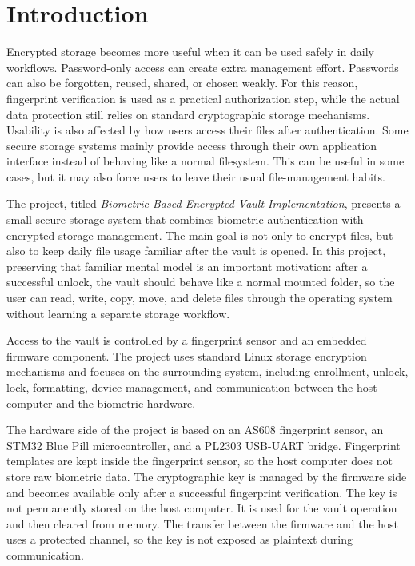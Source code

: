 \chapter{Introduction}

Encrypted storage becomes more useful when it can be used safely in daily workflows. Password-only access can create extra management effort. Passwords can also be forgotten, reused, shared, or chosen weakly. For this reason, fingerprint verification is used as a practical authorization step, while the actual data protection still relies on standard cryptographic storage mechanisms. Usability is also affected by how users access their files after authentication. Some secure storage systems mainly provide access through their own application interface instead of behaving like a normal filesystem. This can be useful in some cases, but it may also force users to leave their usual file-management habits.

The project, titled \textit{Biometric-Based Encrypted Vault Implementation}, presents a small secure storage system that combines biometric authentication with encrypted storage management. The main goal is not only to encrypt files, but also to keep daily file usage familiar after the vault is opened. In this project, preserving that familiar mental model is an important motivation: after a successful unlock, the vault should behave like a normal mounted folder, so the user can read, write, copy, move, and delete files through the operating system without learning a separate storage workflow.

Access to the vault is controlled by a fingerprint sensor and an embedded firmware component. The project uses standard Linux storage encryption mechanisms and focuses on the surrounding system, including enrollment, unlock, lock, formatting, device management, and communication between the host computer and the biometric hardware.

The hardware side of the project is based on an AS608 fingerprint sensor, an STM32 Blue Pill microcontroller, and a PL2303 USB-UART bridge. Fingerprint templates are kept inside the fingerprint sensor, so the host computer does not store raw biometric data. The cryptographic key is managed by the firmware side and becomes available only after a successful fingerprint verification. The key is not permanently stored on the host computer. It is used for the vault operation and then cleared from memory. The transfer between the firmware and the host uses a protected channel, so the key is not exposed as plaintext during communication.

